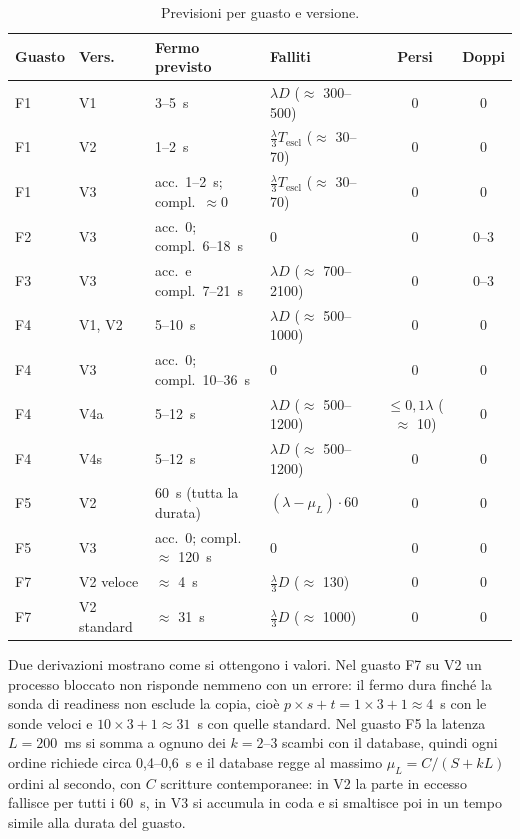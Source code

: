 \begin{table}[H]
\centering
\caption{Previsioni per guasto e versione.}
\label{tab:previsioni}
\small
\begin{tabularx}{\linewidth}{@{}llLLcc@{}}
\toprule
\textbf{Guasto} & \textbf{Vers.} & \textbf{Fermo previsto} & \textbf{Falliti} & \textbf{Persi} & \textbf{Doppi} \\
\midrule
F1 & V1 & 3--5~s & $\lambda D$ ($\approx$ 300--500) & 0 & 0 \\
F1 & V2 & 1--2~s & $\frac{\lambda}{3} T_{\text{escl}}$ ($\approx$ 30--70) & 0 & 0 \\
F1 & V3 & acc.\ 1--2~s; compl.\ $\approx 0$ & $\frac{\lambda}{3} T_{\text{escl}}$ ($\approx$ 30--70) & 0 & 0 \\
F2 & V3 & acc.\ 0; compl.\ 6--18~s & 0 & 0 & 0--3 \\
F3 & V3 & acc.\ e compl.\ 7--21~s & $\lambda D$ ($\approx$ 700--2100) & 0 & 0--3 \\
F4 & V1, V2 & 5--10~s & $\lambda D$ ($\approx$ 500--1000) & 0 & 0 \\
F4 & V3 & acc.\ 0; compl.\ 10--36~s & 0 & 0 & 0 \\
F4 & V4a & 5--12~s & $\lambda D$ ($\approx$ 500--1200) & $\le 0{,}1\lambda$ ($\approx$ 10) & 0 \\
F4 & V4s & 5--12~s & $\lambda D$ ($\approx$ 500--1200) & 0 & 0 \\
F5 & V2 & 60~s (tutta la durata) & $(\lambda - \mu_L) \cdot 60$ & 0 & 0 \\
F5 & V3 & acc.\ 0; compl.\ $\approx$ 120~s & 0 & 0 & 0 \\
F7 & V2 veloce & $\approx$ 4~s & $\frac{\lambda}{3} D$ ($\approx$ 130) & 0 & 0 \\
F7 & V2 standard & $\approx$ 31~s & $\frac{\lambda}{3} D$ ($\approx$ 1000) & 0 & 0 \\
\bottomrule
\end{tabularx}
\end{table}

Due derivazioni mostrano come si ottengono i valori. Nel guasto F7 su V2 un processo bloccato non risponde nemmeno con un errore: il fermo dura finché la sonda di readiness non esclude la copia, cioè $p \times s + t = 1 \times 3 + 1 \approx 4$~s con le sonde veloci e $10 \times 3 + 1 \approx 31$~s con quelle standard. Nel guasto F5 la latenza $L = 200$~ms si somma a ognuno dei $k = 2$--$3$ scambi con il database, quindi ogni ordine richiede circa 0,4--0,6~s e il database regge al massimo $\mu_L = C / (S + kL)$ ordini al secondo, con $C$ scritture contemporanee: in V2 la parte in eccesso fallisce per tutti i 60~s, in V3 si accumula in coda e si smaltisce poi in un tempo simile alla durata del guasto.

